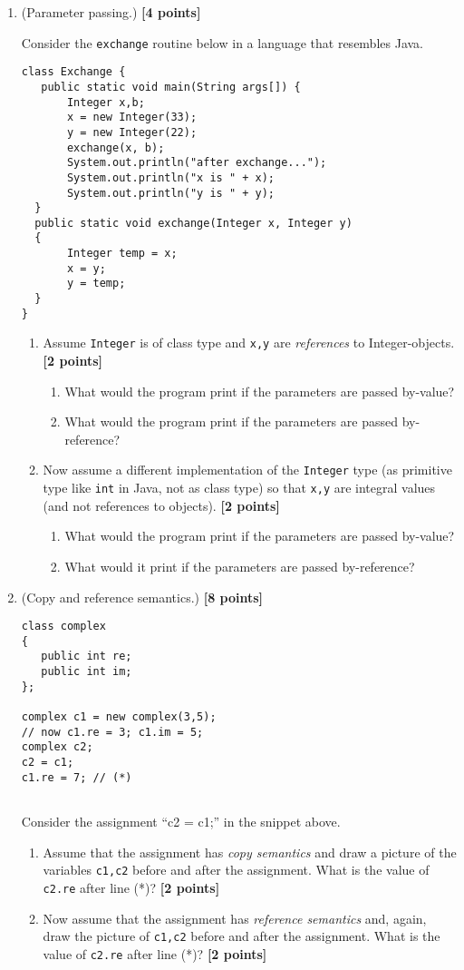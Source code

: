 \documentclass{article}
\begin{document}
\begin{enumerate}
\item (Parameter passing.) \hfill{\bf [4 points]}

Consider the \texttt{exchange} routine below in a language that
resembles Java.  

{\small 
\begin{verbatim}
class Exchange {
   public static void main(String args[]) {
       Integer x,b;
       x = new Integer(33);
       y = new Integer(22);
       exchange(x, b);
       System.out.println("after exchange...");
       System.out.println("x is " + x);
       System.out.println("y is " + y);
  }
  public static void exchange(Integer x, Integer y)
  {
       Integer temp = x;
       x = y;
       y = temp;
  }
}
\end{verbatim}
}

\begin{enumerate}
\item Assume \texttt{Integer} is of class type and \texttt{x,y}
are \textit{references} to Integer-objects. {\textbf{[2 points]}}
\begin{enumerate}
\item What would the program print if the parameters are passed
by-value?
\item What would the program print if the parameters are passed
by-reference?
\end{enumerate}
\item Now assume a different implementation of the \texttt{Integer} type (as primitive
type like \texttt{int} in Java, not
as class type) so
that \texttt{x,y} are integral values (and 
not references to objects). {\textbf{[2 points]}}
\begin{enumerate}
\item What would the program print if the parameters are passed by-value?
\item What would it print if the parameters are passed by-reference?
\end{enumerate} 
\end{enumerate} 
\newpage
\item (Copy and reference semantics.)  \hfill{\textbf{[8 points]}}
{\small 
\begin{verbatim}
class complex 
{
   public int re;
   public int im;
};

complex c1 = new complex(3,5); 
// now c1.re = 3; c1.im = 5;
complex c2;
c2 = c1;    
c1.re = 7; // (*)
   
\end{verbatim}
}
Consider the assignment ``c2 = c1;'' in the snippet above.
\begin{enumerate}
\item 
Assume that the assignment has \textit{copy semantics} and 
draw a picture of the variables \texttt{c1,c2} before and after the assignment.
What  is the value of \texttt{c2.re} after line (*)?
{\textbf{[2 points]}}
\item Now assume that 
the assignment has \textit{reference semantics} and, again, draw the picture of 
 \texttt{c1,c2} before and after the assignment.
What  is the value of \texttt{c2.re} after line (*)?
{\textbf{[2 points]}}


\end{enumerate}
\end{enumerate}
\end{document}
